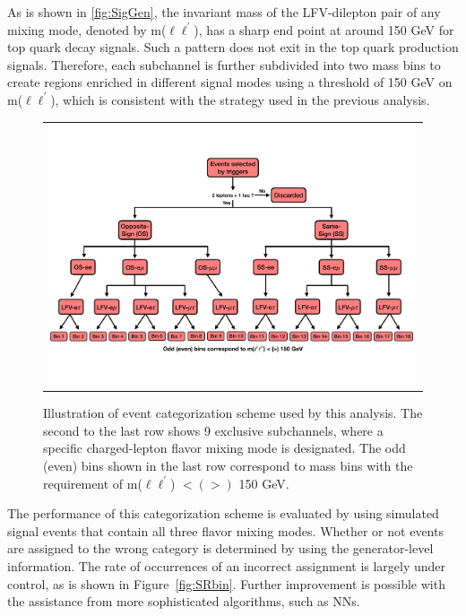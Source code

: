 As is shown in \ref{fig:SigGen}, the invariant mass of the LFV-dilepton pair of any mixing mode, denoted by m($\ell\ell^{\prime}$), has a sharp end point at around 150 GeV for top quark decay signals. Such a pattern does not exit in the top quark production signals. Therefore, each subchannel is further subdivided into two mass bins to create regions enriched in different signal modes using a threshold of 150 GeV on m($\ell\ell^{\prime}$), which is consistent with the strategy used in the previous analysis.

\begin{figure}[tbh!]
 \begin{center}
 \begin{tabular}{c}
 \includegraphics[width=\textwidth]{figures/Part4/Evt/SRFlowChart}
 \end{tabular}
 \caption{Illustration of event categorization scheme used by this analysis. The second to the last row shows 9 exclusive subchannels, where a specific charged-lepton flavor mixing mode is designated. The odd (even) bins shown in the last row correspond to mass bins with the requirement of m($\ell\ell^{\prime}$) $<(>)$ 150 GeV.}
 \label{fig:EvtCat}
 \end{center}
 \end{figure}
 
 The performance of this categorization scheme is evaluated by using simulated signal events that contain all three flavor mixing modes. Whether or not events are assigned to the wrong category is determined by using the generator-level information. The rate of occurrences of an incorrect assignment is largely under control, as is shown in Figure~\ref{fig:SRbin}. Further improvement is possible with the assistance from more sophisticated algorithms, such as \acp{NN}. 
 
